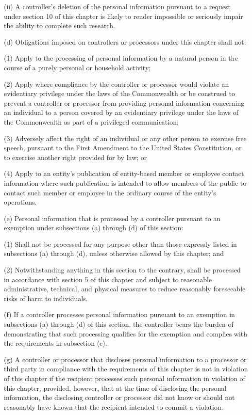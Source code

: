 (ii) A controller’s deletion of the personal information pursuant to a request under section 10 of this chapter is likely to render impossible or seriously impair the ability to complete such research.

(d) Obligations imposed on controllers or processors under this chapter shall not:

(1) Apply to the processing of personal information by a natural person in the course of a purely personal or household activity; 

(2) Apply where compliance by the controller or processor would violate an evidentiary privilege under the laws of the Commonwealth or be construed to prevent a controller or processor from providing personal information concerning an individual to a person covered by an evidentiary privilege under the laws of the Commonwealth as part of a privileged communication;

(3) Adversely affect the right of an individual or any other person to exercise free speech, pursuant to the First Amendment to the United States Constitution, or to exercise another right provided for by law; or

(4) Apply to an entity’s publication of entity-based member or employee contact information where such publication is intended to allow members of the public to contact such member or employee in the ordinary course of the entity’s operations.

(e) Personal information that is processed by a controller pursuant to an exemption under subsections (a) through (d) of this section:

(1) Shall not be processed for any purpose other than those expressly listed in subsections (a) through (d), unless otherwise allowed by this chapter; and

(2) Notwithstanding anything in this section to the contrary, shall be processed in accordance with section 5 of this chapter and subject to reasonable administrative, technical, and physical measures to reduce reasonably foreseeable risks of harm to individuals.

(f) If a controller processes personal information pursuant to an exemption in subsections (a) through (d) of this section, the controller bears the burden of demonstrating that such processing qualifies for the exemption and complies with the requirements in subsection (e).

(g) A controller or processor that discloses personal information to a processor or third party in compliance with the requirements of this chapter is not in violation of this chapter if the recipient processes such personal information in violation of this chapter; provided, however, that at the time of disclosing the personal information, the disclosing controller or processor did not know or should not reasonably have known that the recipient intended to commit a violation.

